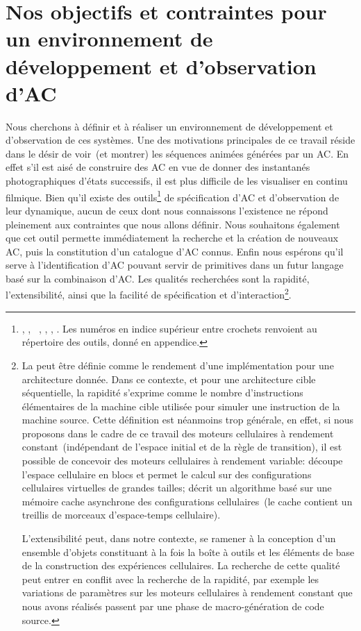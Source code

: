 \section[Objectifs et contraintes]{Nos objectifs et contraintes pour un
  environnement de d\'e\-ve\-lop\-pe\-ment et d'observation d'AC}

Nous cherchons \`a d\'efinir et \`a r\'ealiser un environnement de
d\'eveloppement et d'observation de ces syst\`emes. %
Une des motivations principales de ce travail r\'eside dans le d\'esir de
voir~(et montrer) les s\'equences anim\'ees g\'en\'er\'ees par un AC\@. %
En effet s'il est ais\'e de construire des AC en vue de donner des
instantan\'es photographiques d'\'etats successifs, il est plus difficile de
les visualiser en continu filmique. %
Bien qu'il existe des outils\footnote{%
  , %
  , %
  ~\cite[]{Rucker89}, %
  , %
  , %
  . %
  Les num\'eros en indice sup\'erieur entre crochets renvoient au r\'epertoire des
  outils, donn\'e en appendice.} %
de sp\'ecification d'AC et d'observation de leur dynamique, aucun de
ceux dont nous connaissons l'existence ne r\'epond
pleinement aux contraintes que nous allons d\'efinir. %
Nous souhaitons \'egalement que cet outil permette imm\'ediatement la
recherche et la cr\'eation de nouveaux AC, puis la constitution d'un
catalogue d'AC connus. %
Enfin nous esp\'erons qu'il serve \`a l'identification d'AC pouvant servir
de primitives dans un futur langage bas\'e sur la combinaison d'AC. %
Les qualit\'es recherch\'ees sont la rapidit\'e, l'extensibilit\'e, ainsi que la
facilit\'e de sp\'ecification et d'interaction\footnote{%
  La  peut \^etre d\'efinie comme le rendement d'une
  impl\'ementation   pour une architecture donn\'ee. %
  Dans ce contexte, et pour une architecture cible s\'equentielle, la
  rapidit\'e s'exprime comme le nombre d'instructions
  \'el\'ementaires de la machine cible utilis\'ee pour simuler une
  instruction de la machine source. %
  Cette d\'efinition est n\'eanmoins trop g\'en\'erale, en effet, si nous
  proposons dans le cadre de ce travail des moteurs cellulaires \`a
  rendement constant~(\ie ind\'ependant de l'espace initial et de la
  r\`egle de transition), il est possible de concevoir des moteurs
  cellulaires \`a rendement variable:  d\'ecoupe
  l'espace cellulaire en blocs et permet le calcul sur des
  configurations cellulaires virtuelles de grandes tailles;
  \cite{Gosper84} d\'ecrit un algorithme bas\'e sur une m\'emoire cache
  asynchrone des configurations cellulaires~(le cache contient un
  treillis de morceaux d'espace-temps cellulaire). %

  L'extensibilit\'e peut, dans notre contexte, se ramener \`a la
  conception d'un ensemble d'objets constituant \`a la fois la bo\^ite \`a
  outils et les \'el\'ements de base de la construction des exp\'eriences
  cellulaires. %
  La recherche de cette qualit\'e peut entrer en conflit avec la
  recherche de la rapidit\'e, par exemple les variations de param\`etres
  sur les moteurs cellulaires \`a rendement constant que nous avons
  r\'ealis\'es passent par une phase de macro-g\'en\'eration de code source.}. %


